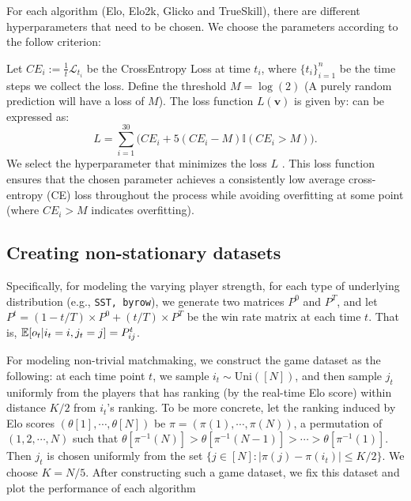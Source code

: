 \label{sec:appendix-choosing_parameter}

For each algorithm (Elo, Elo2k, Glicko and TrueSkill), there are different hyperparameters that need to be chosen. We choose the parameters according to the follow criterion:

Let $CE_i := \frac{1}{t}\mathcal{L}_{t_i}$ be the CrossEntropy Loss at time $t_i$, where $\{t_i\}_{i=1}^n$ be the time steps we collect the loss.
Define the threshold $ M = \log(2) $ (A purely random prediction will have a loss of $M$). The loss function  $L(\mathbf{v})$ is given by:
 can be expressed as:
$$
L = \sum_{i=1}^{30} \big( CE_i + 5 (CE_i - M) \mathbb{I}(CE_i > M) \big).
$$
We select the hyperparameter that minimizes the loss $L$ . This loss function ensures that the chosen parameter achieves a consistently low average cross-entropy (CE) loss throughout the process while avoiding overfitting at some point (where  $CE_i > M$  indicates overfitting).

\subsection{Creating non-stationary datasets}
\label{sec:appendix-non_stationary}

Specifically, for modeling the varying player strength, for each type of underlying distribution (e.g., \texttt{SST, byrow}), we generate two matrices $P^0$ and $P^T$, and let $P^t = (1-t/T) \times P^0 + (t/T) \times P^T$ be the win rate matrix at each time $t$. That is, $\mathbb{E}[o_t|i_t=i,j_t=j]=P^t_{ij}$.



For modeling non-trivial matchmaking, we construct the game dataset as the following: at each time point $t$, we sample $i_t \sim \text{Uni}([N])$, and then sample $j_t$ uniformly from the players that has ranking (by the real-time Elo score) within distance $K/2$ from $i_t$'s ranking. To be more concrete, let the ranking induced by Elo scores $(\theta[1], \cdots, \theta[N])$ be $\pi=(\pi(1), \cdots, \pi(N))$, a permutation of $(1,2,\cdots,N)$ such that $\theta [\pi^{-1}(N)] > \theta [\pi^{-1}(N-1)] > \cdots > \theta [\pi^{-1}(1)] $. Then $j_t$ is chosen uniformly from the set $\{j \in [N]: |\pi(j)-\pi(i_t)| \leq K/2\}$. We choose $K=N/5$. After constructing such a game dataset, we fix this dataset and plot the performance of each algorithm